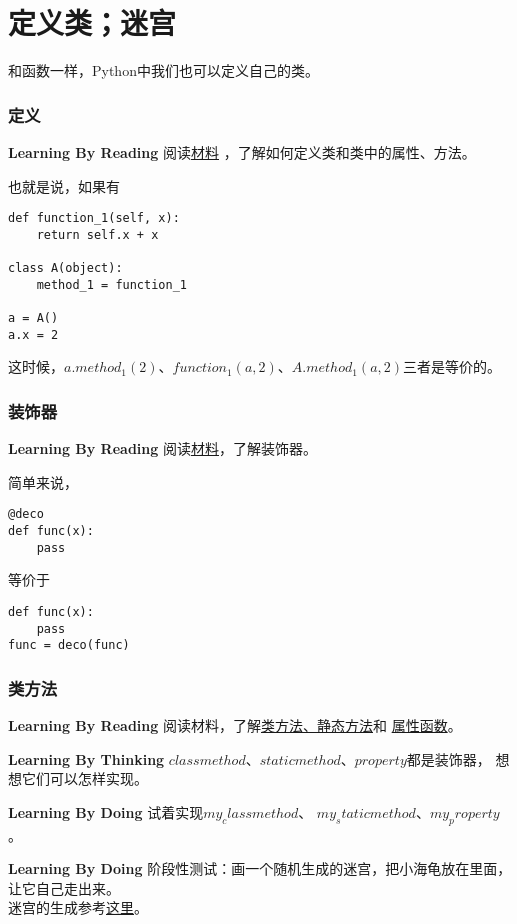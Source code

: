 \chapter{定义类；迷宫}
和函数一样，Python中我们也可以定义自己的类。
\subsection{定义}
\begin{paperbox}{\textbf{Learning By Reading}\starfive}
阅读\href{https://www.liaoxuefeng.com/wiki/0014316089557264a6b348958f449949df42a6d3a2e542c000/001431864715651c99511036d884cf1b399e65ae0d27f7e000}{材料}
，了解如何定义类和类中的属性、方法。\\
\end{paperbox}
也就是说，如果有
\begin{lstlisting}[style=PythonStyle1, caption=Rectangle]
def function_1(self, x):
    return self.x + x

class A(object):
    method_1 = function_1

a = A()
a.x = 2
\end{lstlisting}
这时候，$a.method_1(2)$、$function_1(a, 2)$、$A.method_1(a, 2)$三者是等价的。
\subsection{装饰器}
\begin{paperbox}{\textbf{Learning By Reading}\starfive}
阅读\href{http://www.cnblogs.com/Jerry-Chou/archive/2012/05/23/python-decorator-explain.html}{材料}，了解装饰器。\\
\end{paperbox}
简单来说，
\begin{lstlisting}[style=PythonStyle1, caption=Rectangle]
@deco
def func(x):
    pass
\end{lstlisting}
等价于
\begin{lstlisting}[style=PythonStyle1, caption=Rectangle]
def func(x):
    pass
func = deco(func)
\end{lstlisting}
\subsection{类方法}
\begin{paperbox}{\textbf{Learning By Reading}\starfive}
阅读材料，了解\href{http://blog.csdn.net/handsomekang/article/details/9615239}{类方法、静态方法}和
\href{http://python.jobbole.com/80955/}{属性函数}。
\end{paperbox}
\begin{paperbox}{\textbf{Learning By Thinking}\starfive}
$classmethod$、$staticmethod$、$property$都是装饰器，
想想它们可以怎样实现。
\end{paperbox}
\begin{paperbox}{\textbf{Learning By Doing}\startwo}
试着实现$my_classmethod$、
$my_staticmethod$、$my_property$。
\end{paperbox}
\begin{paperbox}{\textbf{Learning By Doing}\starfive}
阶段性测试：画一个随机生成的迷宫，把小海龟放在里面，让它自己走出来。\\
迷宫的生成参考\href{http://maskray.me/blog/2012-11-02-perfect-maze-generation}{这里}。
\end{paperbox}
